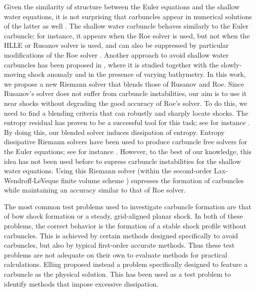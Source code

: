 \documentclass[preprint, 11pt]{article}
\begin{document}
Given the similarity of structure between the Euler equations and the shallow
water equations, it is not surprising that carbuncles appear in numerical
solutions of the latter as well \cite{kemm2014note}.
The shallow water carbuncle behaves similarly to the
Euler carbuncle; for instance, it appears when the Roe solver is used, but not when
the HLLE or Rusanov solver is used, and can also be suppressed by particular modifications
of the Roe solver \cite{kemm2014note,bader2014carbuncle}.  Another approach to avoid
shallow water carbuncles has been proposed in \cite{navas2019improved}, where it is
studied together with the slowly-moving shock anomaly and in the presence of varying bathymetry.
In this work, we propose a new Riemann solver that blends those of Rusanov and Roe.
{\color{red} Since Rusanov's solver does not suffer from carbuncle instabilities,
  our aim is to use it near shocks without degrading the good accuracy of Roe's solver. 
  To do this, we need to find a blending criteria that can robustly and sharply locate shocks.
  The entropy residual has proven to be a successful tool for this task; see for instance
  \cite{guermond2011entropy,guermond2018second,guermond2018well}.
  By doing this, our blended solver induces dissipation of entropy.
  Entropy dissipative Riemann solvers have been used to produce carbuncle free solvers for the Euler equations;
  see for instance \cite{ismail2009affordable,ismail2009proposed}.
  However, to the best of our knowledge, this idea has not been used before to supress carbuncle instabilities for the
  shallow water equations. 
}
Using this Riemann solver (within the second-order Lax-Wendroff-LeVeque 
finite volume scheme \cite{leveque1997wave, leveque2002finite}) supresses the formation of carbuncles 
while maintaining an accuracy similar to that of Roe solver.  

The most common test problems used to investigate carbuncle formation are
that of bow shock formation or a steady, grid-aligned planar shock.
In both of these problems, the correct behavior is the formation of a stable
shock profile without carbuncles.  This is achieved by certain methods
designed specifically to avoid carbuncles, but also by typical first-order
accurate methods.  Thus these test problems are not adequate on their own to
evaluate methods for practical calculations.
Elling \cite{elling2009carbuncle} proposed instead a problem specifically
designed to feature a carbuncle as the physical solution.  This has
been used as a test problem to identify methods that impose excessive dissipation.
\end{document}
